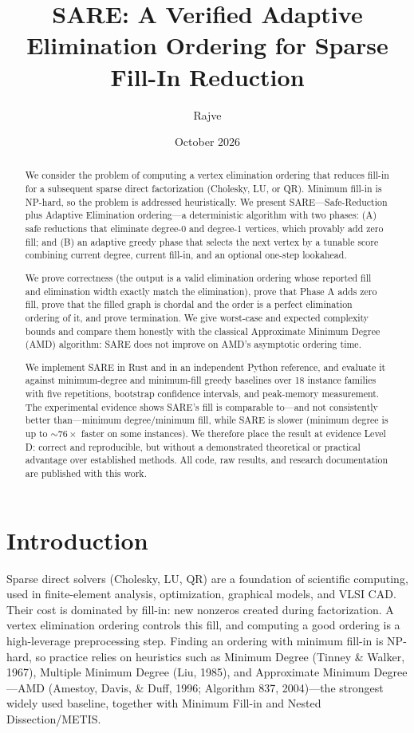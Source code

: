 \documentclass[11pt]{article}
\title{SARE: A Verified Adaptive Elimination Ordering for Sparse Fill-In Reduction}
\author{Rajve}
\affil{Independent research. No institutional affiliation.}
\date{October 2026}
\theoremstyle{plain}
\theoremstyle{definition}
\begin{document}
\maketitle

\begin{abstract}
We consider the problem of computing a vertex elimination ordering that reduces fill-in
for a subsequent sparse direct factorization (Cholesky, LU, or QR). Minimum fill-in is
NP-hard, so the problem is addressed heuristically. We present SARE---Safe-Reduction plus
Adaptive Elimination ordering---a deterministic algorithm with two phases: (A) safe
reductions that eliminate degree-0 and degree-1 vertices, which provably add zero fill; and
(B) an adaptive greedy phase that selects the next vertex by a tunable score combining
current degree, current fill-in, and an optional one-step lookahead.

We prove correctness (the output is a valid elimination ordering whose reported fill and
elimination width exactly match the elimination), prove that Phase A adds zero fill, prove
that the filled graph is chordal and the order is a perfect elimination ordering of it, and
prove termination. We give worst-case and expected complexity bounds and compare them
honestly with the classical Approximate Minimum Degree (AMD) algorithm: SARE does not
improve on AMD's asymptotic ordering time.

We implement SARE in Rust and in an independent Python reference, and evaluate it against
minimum-degree and minimum-fill greedy baselines over 18 instance families with five
repetitions, bootstrap confidence intervals, and peak-memory measurement. The experimental
evidence shows SARE's fill is comparable to---and not consistently better than---minimum
degree/minimum fill, while SARE is slower (minimum degree is up to $\sim76\times$ faster on
some instances). We therefore place the result at evidence Level D: correct and
reproducible, but without a demonstrated theoretical or practical advantage over established
methods. All code, raw results, and research documentation are published with this work.
\end{abstract}

\section{Introduction}
Sparse direct solvers (Cholesky, LU, QR) are a foundation of scientific computing, used in
finite-element analysis, optimization, graphical models, and VLSI CAD. Their cost is
dominated by fill-in: new nonzeros created during factorization. A vertex elimination
ordering controls this fill, and computing a good ordering is a high-leverage preprocessing
step. Finding an ordering with minimum fill-in is NP-hard, so practice relies on heuristics
such as Minimum Degree (Tinney \& Walker, 1967), Multiple Minimum Degree (Liu, 1985), and
Approximate Minimum Degree---AMD (Amestoy, Davis, \& Duff, 1996; Algorithm 837, 2004)---the
strongest widely used baseline, together with Minimum Fill-in and Nested Dissection/METIS.
\end{document}
